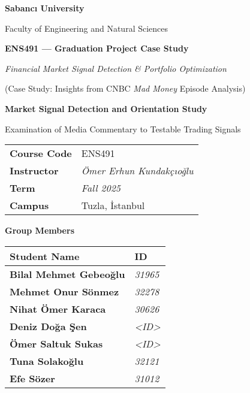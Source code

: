 \documentclass[12pt,a4paper]{article}
\begin{document}
\thispagestyle{empty}
\begin{titlepage}
    \centering

    {\Large\bfseries \textcolor{SUblue}{Sabancı University}}\par
    \vspace{0.15cm}
    {\large Faculty of Engineering and Natural Sciences}\par
    \vspace{1.2cm}

    {\large \textbf{ENS491 — Graduation Project Case Study}}\par
    \vspace{0.25cm}
    {\normalsize \textit{Financial Market Signal Detection \& Portfolio Optimization}}\par
    \vspace{0.1cm}
    {\normalsize (Case Study: Insights from CNBC \textit{Mad Money} Episode Analysis)}\par

    \vspace{1.5cm}
    {\large\bfseries 
        Market Signal Detection and Orientation Study
    }\par
    \vspace{0.3cm}
    {\large Examination of Media Commentary to Testable Trading Signals}\par

    \vspace{1.6cm}
    \renewcommand{\arraystretch}{1.3}
    \begin{tabular}{>{\bfseries}p{3.5cm} p{10cm}}
        Course Code & ENS491 \\
        Instructor  & \textit{Ömer Erhun Kundakçıoğlu}\\
        Term        & \textit{Fall 2025} \\
        Campus      & Tuzla, İstanbul \\
    \end{tabular}

    \vspace{2cm}

    {\large\bfseries Group Members}\par
    \vspace{0.5cm}
    \begin{tabularx}{\textwidth}{>{\bfseries}p{6cm} X}
    \textbf{Student Name} & \textbf{ID} \\
    \hline
    Bilal Mehmet Gebeoğlu & \textit{31965} \\
    Mehmet Onur Sönmez    & \textit{32278} \\
    Nihat Ömer Karaca     & \textit{30626} \\
    Deniz Doğa Şen        & \textit{<ID>} \\
    Ömer Saltuk Sukas     & \textit{<ID>} \\
    Tuna Solakoğlu        & \textit{32121} \\
    Efe Sözer             & \textit{31012} \\
\end{tabularx}


\end{titlepage}
\end{document}
